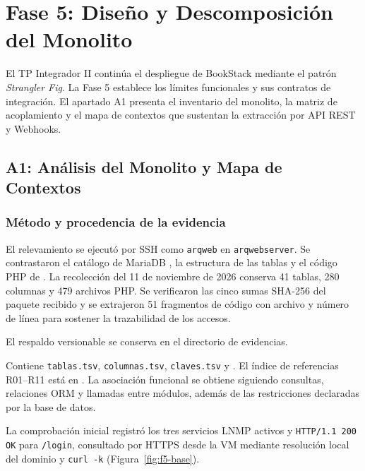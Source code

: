 \clearpage
\begingroup
\setlength{\emergencystretch}{2em}
\section{Fase 5: Diseño y Descomposición del Monolito}
\label{sec:fase5}
El TP Integrador II continúa el despliegue de BookStack mediante el patrón
\textit{Strangler Fig}. La Fase 5 establece los límites funcionales y sus
contratos de integración. El apartado A1 presenta el inventario del monolito,
la matriz de acoplamiento y el mapa de contextos que sustentan la extracción
por API REST y Webhooks.

\subsection{A1: Análisis del Monolito y Mapa de Contextos}
\label{sec:fase5-a1}
\subsubsection{Método y procedencia de la evidencia}
El relevamiento se ejecutó por SSH como \texttt{arqweb} en
\texttt{arqwebserver}. Se contrastaron el catálogo de MariaDB
, la estructura de las tablas y el código PHP de
. La recolección del 11 de noviembre de 2026
conserva 41 tablas, 280 columnas y 479 archivos PHP. Se verificaron las cinco
sumas SHA-256 del paquete recibido y se extrajeron 51 fragmentos de código
con archivo y número de línea para sostener la trazabilidad de los accesos.

El respaldo versionable se conserva en el directorio de evidencias.
\begin{quote}\small
{}
\end{quote}
Contiene
\texttt{tablas.tsv}, \texttt{columnas.tsv}, \texttt{claves.tsv} y
. El índice de referencias R01--R11 está en
. La asociación funcional se obtiene
siguiendo consultas, relaciones ORM y llamadas entre módulos, además de
las restricciones declaradas por la base de datos.

La comprobación inicial registró los tres servicios LNMP activos y
\texttt{HTTP/1.1 200 OK} para \texttt{/login}, consultado por HTTPS desde la
VM mediante resolución local del dominio y \texttt{curl -k}
(Figura~\ref{fig:f5-base}).

